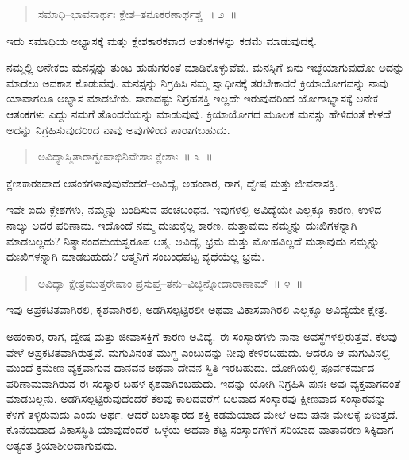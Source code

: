 \vspace{-0.3cm}

\begin{verse}
ಸಮಾಧಿ–ಭಾವನಾರ್ಥಃ ಕ್ಲೇಶ–ತನೂಕರಣಾರ್ಥಶ್ಚ~॥ ೨~॥
\end{verse}

\vspace{-0.3cm}

ಇದು ಸಮಾಧಿಯ ಅಭ್ಯಾಸಕ್ಕೆ ಮತ್ತು ಕ್ಲೇಶಕಾರಕವಾದ ಆತಂಕಗಳನ್ನು ಕಡಮೆ ಮಾಡುವುದಕ್ಕೆ. 

ನಮ್ಮಲ್ಲಿ ಅನೇಕರು ಮನಸ್ಸನ್ನು ತುಂಟ ಹುಡುಗರಂತೆ ಮಾಡಿಕೊಳ್ಳುವೆವು. ಮನಸ್ಸಿಗೆ ಏನು ಇಚ್ಛೆಯಾಗುವುದೋ ಅದನ್ನು ಮಾಡಲು ಅವಕಾಶ ಕೊಡುವೆವು. ಮನಸ್ಸನ್ನು ನಿಗ್ರಹಿಸಿ ನಮ್ಮ ಸ್ವಾಧೀನಕ್ಕೆ ತರಬೇಕಾದರೆ ಕ್ರಿಯಾಯೋಗವನ್ನು ನಾವು ಯಾವಾಗಲೂ ಅಭ್ಯಾಸ ಮಾಡಬೇಕು. ಸಾಕಾದಷ್ಟು ನಿಗ್ರಹಶಕ್ತಿ ಇಲ್ಲದೇ ಇರುವುದರಿಂದ ಯೋಗಾಭ್ಯಾಸಕ್ಕೆ ಅನೇಕ ಆತಂಕಗಳು ಎದ್ದು ನಮಗೆ ತೊಂದರೆಯನ್ನು ಮಾಡುವುವು. ಕ್ರಿಯಾಯೋಗದ ಮೂಲಕ ಮನಸ್ಸು ಹೇಳಿದಂತೆ ಕೇಳದೆ ಅದನ್ನು ನಿಗ್ರಹಿಸುವುದರಿಂದ ನಾವು ಅವುಗಳಿಂದ ಪಾರಾಗಬಹುದು. 

\vspace{-0.3cm}

\begin{verse}
ಅವಿದ್ಯಾಸ್ಮಿತಾರಾಗ್ವೇಷಾಭಿನಿವೇಶಾಃ ಕ್ಲೇಶಾಃ~॥ ೩~॥
\end{verse}

\vspace{-0.3cm}

ಕ್ಲೇಶಕಾರಕವಾದ ಆತಂಕಗಳಾವುವುವೆಂದರೆ–ಅವಿದ್ಯೆ, ಅಹಂಕಾರ, ರಾಗ, ದ್ವೇಷ ಮತ್ತು ಜೀವನಾಸಕ್ತಿ. 

ಇವೇ ಐದು ಕ್ಲೇಶಗಳು, ನಮ್ಮನ್ನು ಬಂಧಿಸುವ ಪಂಚಬಂಧನ. ಇವುಗಳಲ್ಲಿ ಅವಿದ್ಯೆಯೇ ಎಲ್ಲಕ್ಕೂ ಕಾರಣ, ಉಳಿದ ನಾಲ್ಕು ಅದರ ಪರಿಣಾಮ. ಇದೊಂದೆ ನಮ್ಮ ದುಃಖಕ್ಕೆಲ್ಲ ಕಾರಣ. ಮತ್ತಾವುದು ನಮ್ಮನ್ನು ದುಃಖಿಗಳನ್ನಾಗಿ ಮಾಡಬಲ್ಲದು? ನಿತ್ಯಾನಂದಮಯಸ್ವರೂಪ ಆತ್ಮ. ಅವಿದ್ಯೆ, ಭ್ರಮೆ ಮತ್ತು ಮೋಹವಿಲ್ಲದೆ ಮತ್ತಾವುದು ನಮ್ಮನ್ನು ದುಃಖಿಗಳನ್ನಾಗಿ ಮಾಡಬಹುದು? ಆತ್ಮನಿಗೆ ಸಂಬಂಧಪಟ್ಟ ವ್ಯಥೆಯೆಲ್ಲ ಭ್ರಮೆ. 

\vspace{-0.3cm}

\begin{verse}
ಅವಿದ್ಯಾ ಕ್ಷೇತ್ರಮುತ್ತರೇಷಾಂ ಪ್ರಸುಪ್ತ–ತನು–ವಿಚ್ಛಿನ್ನೋದಾರಾಣಾಮ್​~॥ ೪~॥
\end{verse}

\vspace{-0.3cm}

ಇವು ಅಪ್ರಕಟಿತವಾಗಿರಲಿ, ಕೃಶವಾಗಿರಲಿ, ಅಡಗಿಸಲ್ಪಟ್ಟಿರಲೀ ಅಥವಾ ವಿಕಾಸವಾಗಿರಲಿ ಎಲ್ಲಕ್ಕೂ ಅವಿದ್ಯೆಯೇ ಕ್ಷೇತ್ರ. 

ಅಹಂಕಾರ, ರಾಗ, ದ್ವೇಷ ಮತ್ತು ಜೀವಾಸಕ್ತಿಗೆ ಕಾರಣ ಅವಿದ್ಯೆ. ಈ ಸಂಸ್ಕಾರಗಳು ನಾನಾ ಅವಸ್ಥೆಗಳಲ್ಲಿರುತ್ತವೆ. ಕೆಲವು ವೇಳೆ ಅಪ್ರಕಟಿತವಾಗಿರುತ್ತವೆ. ಮಗುವಿನಂತೆ ಮುಗ್ಧ ಎಂಬುದನ್ನು ನೀವು ಕೇಳಿರಬಹುದು. ಆದರೂ ಆ ಮಗುವಿನಲ್ಲಿ ಮುಂದೆ ಕ್ರಮೇಣ ವ್ಯಕ್ತವಾಗುವ ದಾನವನ ಅಥವಾ ದೇವನ ಸ್ಥಿತಿ ಇರಬಹುದು. ಯೋಗಿಯಲ್ಲಿ ಪೂರ್ವಕರ್ಮದ ಪರಿಣಾಮವಾಗಿರುವ ಈ ಸಂಸ್ಕಾರ ಬಹಳ ಕೃಶವಾಗಿರಬಹುದು. ಇದನ್ನು ಯೋಗಿ ನಿಗ್ರಹಿಸಿ ಪುನಃ ಅವು ವ್ಯಕ್ತವಾಗದಂತೆ ಮಾಡಬಲ್ಲನು. ಅಡಗಿಸಲ್ಪಟ್ಟಿರುವುದೆಂದರೆ ಕೆಲವು ಕಾಲದವರೆಗೆ ಬಲವಾದ ಸಂಸ್ಕಾರವು ಕ್ಷೀಣವಾದ ಸಂಸ್ಕಾರವನ್ನು ಕೆಳಗೆ ತಳ್ಳಿರುವುದು ಎಂದು ಅರ್ಥ. ಆದರೆ ಬಲಾತ್ಕಾರದ ಶಕ್ತಿ ಕಡಮೆಯಾದ ಮೇಲೆ ಅದು ಪುನಃ ಮೇಲಕ್ಕೆ ಏಳುತ್ತದೆ. ಕೊನೆಯದಾದ ವಿಕಾಸಸ್ಥಿತಿ ಯಾವುದೆಂದರೆ–ಒಳ್ಳೆಯ ಅಥವಾ ಕೆಟ್ಟ ಸಂಸ್ಕಾರಗಳಿಗೆ ಸರಿಯಾದ ವಾತಾವರಣ ಸಿಕ್ಕಿದಾಗ ಅತ್ಯಂತ ಕ್ರಿಯಾಶೀಲವಾಗುವುದು. 

